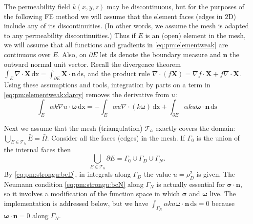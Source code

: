 \documentclass[11pt]{amsart}
\newcommand{\bn}{\mathbf{n}}
\newcommand{\bX}{\mathbf{X}}
\newcommand{\bsigma}{\bm{\sigma}}
\newcommand{\bomega}{\bm{\omega}}
\newcommand{\cT}{\mathcal{T}}
\newcommand{\dx}{\mathrm{dx}}
\newcommand{\ds}{\mathrm{ds}}
\newcommand{\Div}{\nabla\cdot}
\newcommand{\grad}{\nabla}
\begin{document}
The permeability field $k(x,y,z)$ may be discontinuous, but for the purposes of the following FE method we will assume that the element faces (edges in 2D) include any of its discontinuities.  (In other words, we assume the mesh is adapted to any permeability discontinuities.)  Thus if $E$ is an (open) element in the mesh, we will assume that all functions and gradients in \eqref{eq:pm:elementweak} are continuous over $E$.  Also, on $\partial E$ let $\ds$ denote the boundary measure and $\bn$ the outward normal unit vector.  Recall the divergence theorem $\int_E \Div \bX\,\dx = \int_{\partial E} \bX\cdot \bn\,\ds$, and the product rule $\Div(f\bX) = \grad f \cdot \bX + f \Div \bX$.  Using these assumptions and tools, integration by parts on a term in \eqref{eq:pm:elementweak:darcy} removes the derivative from $u$:
\begin{equation}
\int_E \alpha k \grad u \cdot \bomega\,\dx = - \int_E \alpha u \Div\left(k \bomega\right)\,\dx + \int_{\partial E} \alpha k u \bomega\cdot\bn\,\ds \label{eq:elementweak:ibp}
\end{equation}

Next we assume that the mesh (triangulation) $\cT_h$ exactly covers the domain: $\bigcup_{E\in\cT_h} \bar E = \bar \Omega$.  Consider all the faces (edges) in the mesh.  If $\Gamma_0$ is the union of the internal faces then
\begin{equation}
\bigcup_{E\in\cT_h} \partial E = \Gamma_0 \cup \Gamma_D \cup \Gamma_N.
\end{equation}
By \eqref{eq:pm:strongu:bcD}, in integrals along $\Gamma_D$ the value $u=\rho_D^2$ is given.  The Neumann condition \eqref{eq:pm:strongu:bcN} along $\Gamma_N$ is actually essential for $\bsigma\cdot\bn$, so it involves a modification of the function space in which $\bsigma$ and $\bomega$ live.  The implementation is addressed below, but we have $\int_{\Gamma_N} \alpha k u \bomega\cdot\bn\,\ds = 0$ because $\bomega\cdot\bn=0$ along $\Gamma_N$.
\end{document}
